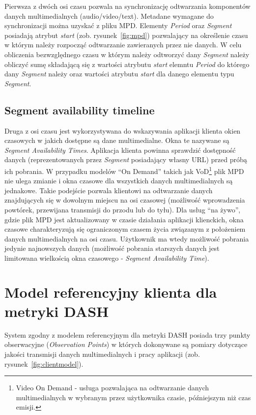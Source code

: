 Pierwsza z dwóch osi czasu pozwala na synchronizację odtwarzania komponentów danych multimedialnych (audio/video/text). Metadane wymagane do synchronizacji można uzyskać z pliku MPD. Elementy \textit{Period} oraz \textit{Segment} posiadają atrybut \textit{start} (zob. rysunek~\ref{fig:mpd}) pozwalający na określenie czasu w którym należy rozpocząć odtwarzanie zawieranych przez nie danych. W celu obliczenia bezwzględnego czasu w którym należy odtworzyć dany \textit{Segment} należy obliczyć sumę składającą się z wartości atrybutu \textit{start} elemntu \textit{Period} do którego dany \textit{Segment} należy oraz wartości atrybutu \textit{start} dla danego elementu typu \textit{Segment}.

\subsection{Segment availability timeline}

Druga z osi czasu jest wykorzystywana do wskazywania aplikacji klienta okien czasowych w jakich dostępne są dane multimedialne. Okna te nazywane są \textit{Segment Availability Times}. Aplikacja klienta powinna sprawdzić dostępność danych (reprezentowanych przez \textit{Segment} posiadający własny URL) przed próbą ich pobrania. W przypadku modelów ``On Demand'' takich jak VoD\footnote{Video On Demand - usługa pozwalająca na odtwarzanie danych multimedialnych w wybranym przez użytkownika czasie, późniejszym niż czas emisji.} plik MPD nie ulega zmianie i okna czasowe dla wszystkich danych multimedialnych są jednakowe. Takie podejście pozwala klientowi na odtwarzanie danych znajdujących się w dowolnym miejscu na osi czasowej (możliwość wprowadzenia powtórek, przewijana transmisji do przodu lub do tyłu). Dla usług ``na żywo'', gdzie plik MPD jest aktualizowany w czasie działania aplikacji klienckich, okna czasowe charakteryzują się ograniczonym czasem życia związanym z położeniem danych multimedialnych na osi czasu. Użytkownik ma wtedy możliwość pobrania jedynie najnowszych danych (możliwość pobrania starszych danych jest limitowana wielkością okna czasowego - \textit{Segment Availability Time}).

\section{Model referencyjny klienta dla metryki DASH}

System zgodny z modelem referencyjnym dla metryki DASH posiada trzy punkty obserwacyjne (\textit{Observation Points}) w których dokonywane są pomiary dotyczące jakości transmisji danych multimedialnych i pracy aplikacji (zob. rysunek~\ref{fig:clientmodel}). 

